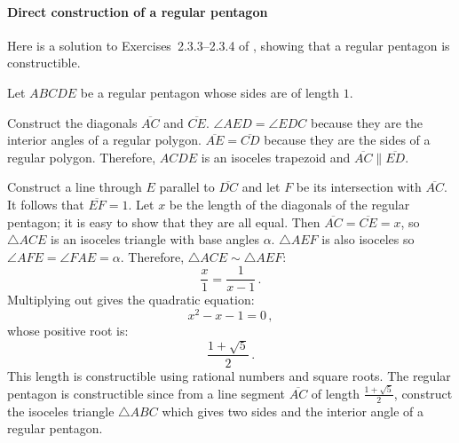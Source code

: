 \documentclass[11pt,a4paper]{article}
\newcommand*{\disfrac}[2]{\displaystyle\frac{#1}{#2}}
\begin{document}
\paragraph{Direct construction of a regular pentagon}

Here is a solution to Exercises~2.3.3--2.3.4 of \cite[page~28]{stillwell}, 
showing that a regular pentagon is constructible.

Let $ABCDE$ be a regular pentagon whose sides are of length $1$. 

\begin{center}
\end{center}
Construct the diagonals $\overline{AC}$ and $\overline{CE}$. $\angle AED=\angle EDC$ because they are the interior angles of a regular polygon. $\overline{AE}=\overline{CD}$ because they are the sides of a regular polygon. Therefore, $ACDE$ is an isoceles trapezoid and $\overline{AC}\parallel \overline{ED}$.


Construct a line through $E$ parallel to $\overline{DC}$ and let $F$ be its intersection with $\overline{AC}$. It follows that $\overline{EF}=1$.
Let $x$ be the length of the diagonals of the regular pentagon; it is easy to show that they are all equal. Then $\overline{AC}=\overline{CE}=x$, so $\triangle ACE$ is an isoceles triangle with base angles $\alpha$. $\triangle AEF$ is also isoceles so $\angle AFE=\angle FAE=\alpha$. Therefore, $\triangle ACE\sim\triangle AEF$:
\[
\disfrac{x}{1}=\disfrac{1}{x-1}\,.
\]
Multiplying out gives the quadratic equation:
\[
x^2-x-1=0\,,
\]
whose positive root is:
\[
\disfrac{1+\sqrt{5}}{2}\,.
\]
This length is constructible using rational numbers and square roots. The regular pentagon is constructible since from a line segment $\overline{AC}$ of length $\frac{1+\sqrt{5}}{2}$, construct the isoceles triangle $\triangle ABC$ which gives two sides and the interior angle of a regular pentagon.
\end{document}
